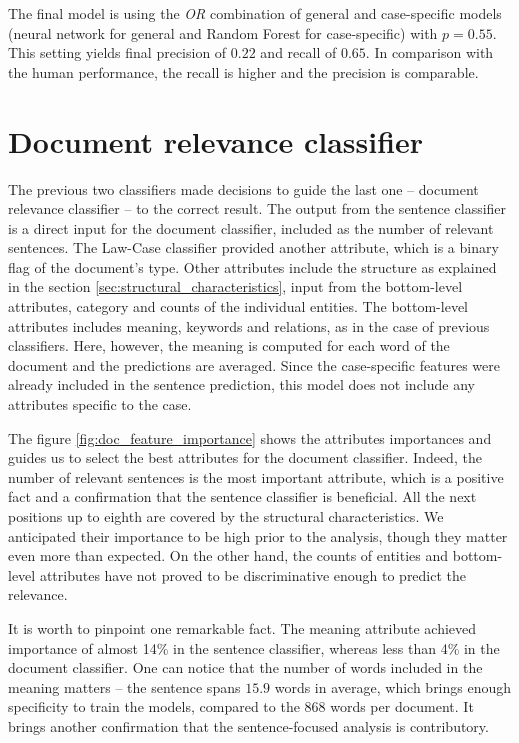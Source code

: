 \documentclass[
  digital, %
  notable,   %
  nolof,     %
  nolot,     %
]{fithesis3}
\begin{document}
The final model is using the \textit{OR} combination of general and case-specific models (neural network for general and Random Forest for case-specific) with $p=0.55$.
This setting yields final precision of $0.22$ and recall of $0.65$.
In comparison with the human performance, the recall is higher and the precision is comparable.

\section{Document relevance classifier}
\label{sec:document-classifier}
The previous two classifiers made decisions to guide the last one -- document relevance classifier -- to the correct result.
The output from the sentence classifier is a direct input for the document classifier, included as the number of relevant sentences.
The Law-Case classifier provided another attribute, which is a binary flag of the document's type.
Other attributes include the structure as explained in the section \ref{sec:structural_characteristics}, input from the bottom-level attributes, category and counts of the individual entities.
The bottom-level attributes includes meaning, keywords and relations, as in the case of previous classifiers.
Here, however, the meaning is computed for each word of the document and the predictions are averaged.
Since the case-specific features were already included in the sentence prediction, this model does not include any attributes specific to the case.

The figure \ref{fig:doc_feature_importance} shows the attributes importances and guides us to select the best attributes for the document classifier.
Indeed, the number of relevant sentences is the most important attribute, which is a positive fact and a confirmation that the sentence classifier is beneficial.
All the next positions up to eighth are covered by the structural characteristics.
We anticipated their importance to be high prior to the analysis, though they matter even more than expected.
On the other hand, the counts of entities and bottom-level attributes have not proved to be discriminative enough to predict the relevance.

It is worth to pinpoint one remarkable fact.
The meaning attribute achieved importance of almost 14\% in the sentence classifier, whereas less than 4\% in the document classifier.
One can notice that the number of words included in the meaning matters -- the sentence spans $15.9$ words in average, which brings enough specificity to train the models, compared to the $868$ words per document.
It brings another confirmation that the sentence-focused analysis is contributory.
\end{document}
